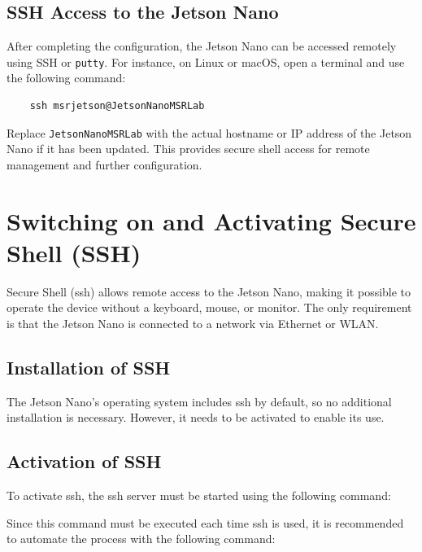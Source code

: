 \subsection{SSH Access to the Jetson Nano}

After completing the configuration, the Jetson Nano can be accessed remotely using SSH or \texttt{putty}. For instance, on Linux or macOS, open a terminal and use the following command:

\begin{verbatim}
	ssh msrjetson@JetsonNanoMSRLab
\end{verbatim}

Replace \texttt{JetsonNanoMSRLab} with the actual hostname or IP address of the Jetson Nano if it has been updated. This provides secure shell access for remote management and further configuration.




\section{Switching on and Activating Secure Shell (SSH)}

Secure Shell (\ac{ssh}) allows remote access to the Jetson Nano, making it possible to operate the device without a keyboard, mouse, or monitor. The only requirement is that the Jetson Nano is connected to a network via Ethernet or WLAN.

\subsection{Installation of SSH}

The Jetson Nano's operating system includes \ac{ssh} by default, so no additional installation is necessary. However, it needs to be activated to enable its use.

\subsection{Activation of SSH}

To activate \ac{ssh}, the \ac{ssh} server must be started using the following command:

\medskip


\medskip

Since this command must be executed each time \ac{ssh} is used, it is recommended to automate the process with the following command:

